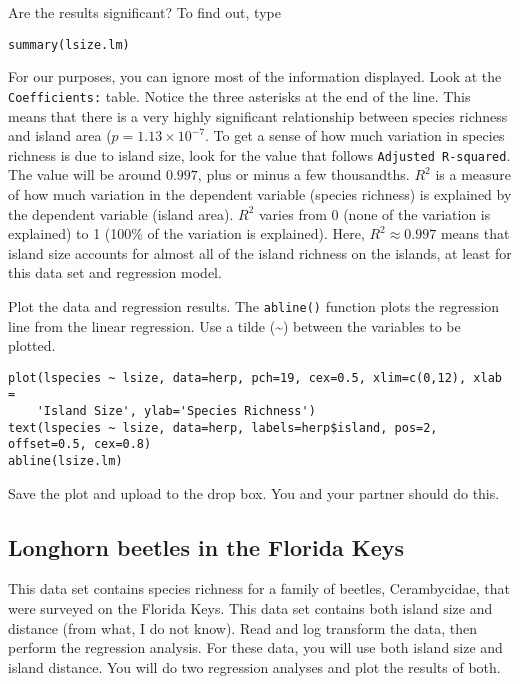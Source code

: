 \documentclass[11pt]{article}
\begin{document}
Are the results significant?  To find out, type

\begin{verbatim}
summary(lsize.lm)

\end{verbatim}

For our purposes, you can ignore most of the information displayed.  Look at the \texttt{Coefficients:} table. Notice the three asterisks at the end of the line.  This means that there is a very highly significant relationship between species richness and island area ($p = 1.13 \times 10^{-7}$.  To get a sense of how much variation in species richness is due to island size, look for the value that follows \texttt{Adjusted R-squared}. The value will be around $0.997$, plus or minus a few thousandths.  $R^2$ is a measure of how much variation in the dependent variable (species richness) is explained by the dependent variable (island area). $R^2$ varies from 0 (none of the variation is explained) to 1 (100\% of the variation is explained). Here, $R^2 \approx 0.997$ means that island size accounts for almost all of the island richness on the islands, at least for this data set and regression model.

Plot the data and regression results.  The \texttt{abline()} function plots the regression line from the linear regression.  Use a tilde (\textasciitilde) between the variables to be plotted.

\begin{verbatim}
plot(lspecies ~ lsize, data=herp, pch=19, cex=0.5, xlim=c(0,12), xlab = 
    'Island Size', ylab='Species Richness')
text(lspecies ~ lsize, data=herp, labels=herp$island, pos=2, offset=0.5, cex=0.8)
abline(lsize.lm)
\end{verbatim}

Save the plot and upload to the drop box. You and your partner should do this.


\subsection*{Longhorn beetles in the Florida Keys}

This data set contains species richness for a family of beetles, Cerambycidae, that were surveyed on the Florida Keys. This data set contains both island size and distance (from what, I do not know).  Read and log transform the data, then perform the regression analysis.  For these data, you will use both island size and island distance.  You will do two regression analyses and plot the results of both.
\end{document}
